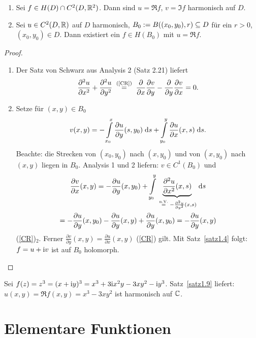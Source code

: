 \documentclass[a4paper,twoside,DIV15,BCOR12mm]{scrbook}
\begin{document}
\begin{satz} \label{satz1.9}
\begin{enumerate}
\item Sei $f\in H(D) \cap C^2(D, \mathbb{R}^2)$. Dann sind $u=\Re f$, $v = \Im f$ harmonisch auf $D$.
\item Sei $u \in C^2(D, \mathbb{R})$ auf $D$ harmonisch, $B_0 := B((x_0,y_0),r) \subseteq D$ für ein $r>0$, $(x_0,y_0)\in D$. Dann existiert ein $f\in H(B_0)$ mit $u = \Re f$.
\end{enumerate}
\end{satz}
\begin{proof}
\begin{enumerate}
\item Der Satz von Schwarz aus Analysis 2 (Satz 2.21) liefert
\[\frac{\partial^2u}{\partial x^2} + \frac{\partial^2u}{\partial y^2} \nach{=}{(\ref{CR})}
\frac{\partial}{\partial x} \frac{\partial v}{\partial y} - \frac{\partial}{\partial y} \frac{\partial v}{\partial x} = 0.\]
\item Setze für $(x, y) \in B_0$
\[v(x, y) = - \int\limits_{x_0}^{x}{\frac{\partial u}{\partial y}(s, y_0)}\;\mathrm{d}s +
\int\limits_{y_0}^{y}{\frac{\partial u}{\partial x}(x, s)}\;\mathrm{d}s.\]
Beachte: die Strecken von $(x_0,y_0)$ nach $(x,y_0)$ und von $(x,y_0)$ nach $(x,y)$ liegen in $B_0$. Analysis 1 und 2 liefern: $v\in C^1(B_0)$ und
\begin{multline*}
\frac{\partial v}{\partial x}(x, y) = - \frac{\partial u}{\partial y}(x, y_0) + \Integral{y_0}{y}{\underbrace{\frac{\partial^2 u}{\partial x^2}(x, s)}_{\nach{=}{n.V.} - \frac{\partial^2 u}{\partial y^2}(x,s)}}{s}\\
= - \frac{\partial u}{\partial y}(x, y_0) - \frac{\partial u}{\partial y}(x, y) + \frac{\partial u}{\partial y}(x, y_0)
= - \frac{\partial u}{\partial y}(x, y)
\end{multline*}
\folgt (\ref{CR})$_2$.
Ferner $\frac{\partial v}{\partial y}(x, y) = \frac{\partial u}{\partial x}(x, y)$ \folgt (\ref{CR}) gilt. Mit
Satz~\ref{satz1.4} folgt: $f=u+\mathrm{i} v$ ist auf $B_0$ holomorph. \qedhere
\end{enumerate}
\end{proof}

\begin{bsp*}
Sei $f(z) = z^3 = (x+\mathrm{i} y)^3 = x^3 + 3\mathrm{i} x^2 y - 3xy^2 - \mathrm{i} y^3$. Satz~\ref{satz1.9} liefert: $u(x,y) = \Re f(x, y) = x^3 - 3xy^2$ ist harmonisch auf $\mathbb{C}$.
\end{bsp*}


\section{Elementare Funktionen}
\end{document}

